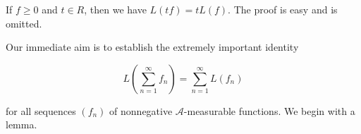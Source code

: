 If $f \geq 0$ and $t \in R$, then we have $L(tf) = tL(f)$. The proof is easy and is omitted.

Our immediate aim is to establish the extremely important identity

$$L\left(\sum_{n=1}^{\infty} f_n\right) = \sum_{n=1}^{\infty} L(f_n)$$

for all sequences $(f_n)$ of nonnegative $\mathcal{A}$-measurable functions. We begin with a lemma.